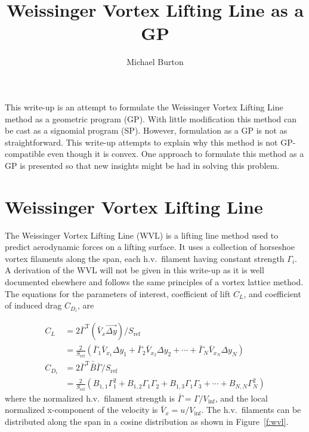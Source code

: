 \documentclass[10pt, a4paper]{article}
\begin{document}
\title{Weissinger Vortex Lifting Line as a GP}
\author{Michael Burton}
\maketitle

This write-up is an attempt to formulate the Weissinger Vortex Lifting Line method as a geometric program (GP).  
With little modification this method can be cast as a signomial program (SP).  
However, formulation as a GP is not as straightforward.  
This write-up attempts to explain why this method is not GP-compatible even though it is convex. 
One approach to formulate this method as a GP is presented so that new insights might be had in solving this problem. 

\section*{Weissinger Vortex Lifting Line}

The Weissinger Vortex Lifting Line (WVL) is a lifting line method used to predict aerodynamic forces on a lifting surface.  It uses a collection of horseshoe vortex filaments along the span, each h.v.\ filament having constant strength $\Gamma_i$. 
A derivation of the WVL will not be given in this write-up as it is well documented elsewhere and follows the same principles of a vortex lattice method. 
The equations for the parameters of interest, coefficient of lift $C_L$, and coefficient of induced drag $C_{D_i}$, are 

\begin{align}
    \label{e:cl}
    C_L &= 2 \bar{\Gamma}^{\mathrm{T}} (\bar{V}_x \vec{\Delta y})/S_{\mathrm{ref}} \\
    &= \frac{2}{S_{\mathrm{ref}}} (\bar{\Gamma}_1 \bar{V}_{x_1} \Delta y_1 + \bar{\Gamma}_2 \bar{V}_{x_2} \Delta y_2 + \cdots + \bar{\Gamma}_N \bar{V}_{x_N} \Delta y_N) \nonumber \\
    \label{e:cdi}
    C_{D_i} &= 2 \bar{\Gamma}^{\mathrm{T}} \bar{\bar{B}} \bar{\Gamma}/S_{\mathrm{ref}} \\
            &= \frac{2}{S_{\mathrm{ref}}} (B_{1,1} \Gamma_1^2 + B_{1,2} \Gamma_1 \Gamma_2 + B_{1,3}\Gamma_1 \Gamma_3 + \cdots + B_{N,N} \Gamma_N^2) \nonumber
\end{align}
where the normalized h.v.\ filament strength is $ \bar{\Gamma} = \Gamma/V_{\inf}$, and the local normalized x-component of the velocity is $\bar{V}_x = u/V_{\inf}$.
The h.v.\ filaments can be distributed along the span in a cosine distribution as shown in Figure~\ref{f:wvl}.  
\end{document}
